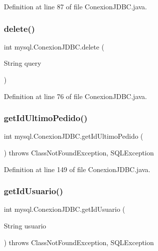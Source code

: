 Definition at line 87 of file Conexion\+J\+D\+B\+C.\+java.

\mbox{\label{classmysql_1_1_conexion_j_d_b_c_a7cb683b19298ad4ccda2ef51abb68302}} 
\subsubsection{\texorpdfstring{delete()}{delete()}}
{\footnotesize\ttfamily int mysql.\+Conexion\+J\+D\+B\+C.\+delete (\begin{DoxyParamCaption}\item[{String}]{query }\end{DoxyParamCaption})}



Definition at line 76 of file Conexion\+J\+D\+B\+C.\+java.

\mbox{\label{classmysql_1_1_conexion_j_d_b_c_abbadbe682819495c2b2afd962afba245}} 
\subsubsection{\texorpdfstring{get\+Id\+Ultimo\+Pedido()}{getIdUltimoPedido()}}
{\footnotesize\ttfamily int mysql.\+Conexion\+J\+D\+B\+C.\+get\+Id\+Ultimo\+Pedido (\begin{DoxyParamCaption}{ }\end{DoxyParamCaption}) throws Class\+Not\+Found\+Exception, S\+Q\+L\+Exception}



Definition at line 149 of file Conexion\+J\+D\+B\+C.\+java.

\mbox{\label{classmysql_1_1_conexion_j_d_b_c_a4dde03f79391c9a52f7a84e281c5a696}} 
\subsubsection{\texorpdfstring{get\+Id\+Usuario()}{getIdUsuario()}}
{\footnotesize\ttfamily int mysql.\+Conexion\+J\+D\+B\+C.\+get\+Id\+Usuario (\begin{DoxyParamCaption}\item[{String}]{usuario }\end{DoxyParamCaption}) throws Class\+Not\+Found\+Exception, S\+Q\+L\+Exception}



